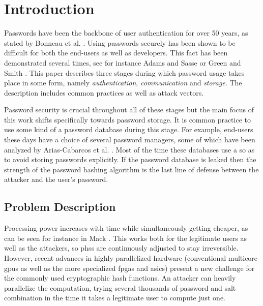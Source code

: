 \chapter{Introduction}
\label{sec:introduction}
Passwords have been the backbone of user authentication for over 50 years, as stated by Bonneau et al. \cite{bonneau:2015:passwords-and-evolution-of-auth}. Using passwords securely has been shown to be difficult for both the end-users as well as developers. This fact has been demonstrated several times, see for instance Adams and Sasse \cite{adams:1999:users-are-not-the-enemy} or Green and Smith \cite{green:2016:developers-are-not-the-enemy}. This paper describes three stages during which password usage takes place in some form, namely \emph{authentication}, \emph{communication} and \emph{storage}. The description includes common practices as well as attack vectors.

Password security is crucial throughout all of these stages but the main focus of this work shifts specifically towards password storage. It is common practice to use some kind of a password database during this stage. For example, end-users these days have a choice of several password managers, some of which have been analyzed by Arias-Cabarcos et al. \cite{arias:2016:comparing}. Most of the time these databases use a  so as to avoid storing passwords explicitly. If the password database is leaked then the strength of the password hashing algorithm is the last line of defense between the attacker and the user's password.

\section{Problem Description}
Processing power increases with time while simultaneously getting cheaper, as can be seen for instance in Mack \cite{mack:2015:the-multiple-lives-of-moores-law}. This works both for the legitimate users as well as the attackers, so \glspl{phs} are continuously adjusted to stay irreversible. However, recent advances in highly parallelized hardware (conventional multicore \glspl{gpu} as well as the more specialized \glspl{fpga} and \glspl{asic}) present a new challenge for the commonly used cryptographic hash functions. An attacker can heavily parallelize the computation, trying several thousands of password and salt combination in the time it takes a legitimate user to compute just one.

